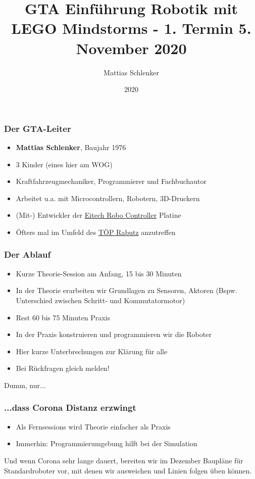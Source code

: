 \documentclass{beamer}
\title{GTA Einführung Robotik mit LEGO Mindstorms - 1. Termin 5. November 2020}
\author{Mattias Schlenker}
\institute{Wilhelm-Ostwald-Gymnasium}
\date{2020}
\begin{document}
\frame{\titlepage}

\begin{frame}
\frametitle{Der GTA-Leiter}
\begin{itemize}
\item \textbf{Mattias Schlenker}, Baujahr 1976
\item 3 Kinder (eines hier am WOG) 
\item Kraftfahrzeugmechaniker, Programmierer und Fachbuchautor 
\item Arbeitet u.a. mit Microcontrollern, Robotern, 3D-Druckern 
\item (Mit-) Entwickler der \href{https://www.youtube.com/watch?v=-ncd1DkRh1M}{Eitech Robo Controller} Platine  
\item Öfters mal im Umfeld des \href{http://www.projektzentrum-rabutz.de/}{TÖP Rabutz} anzutreffen
\end{itemize}
\end{frame}

\begin{frame}
\frametitle{Der Ablauf}
\begin{itemize}
\item Kurze Theorie-Session am Anfang, 15 bis 30 Minuten
\item In der Theorie erarbeiten wir Grundlagen zu Sensoren, Aktoren 
(Bspw. Unterschied zwischen Schritt- und Kommutatormotor)
\item Rest 60 bis 75 Minuten Praxis 
\item In der Praxis konstruieren und programmieren wir die Roboter
\item Hier kurze Unterbrechungen zur Klärung für alle 
\item Bei Rückfragen gleich melden!
\end{itemize}

Dumm, nur...

\end{frame}

\begin{frame}
\frametitle{...dass Corona Distanz erzwingt}
\begin{itemize}
\item Als Fernsessions wird Theorie einfacher als Praxis
\item Immerhin: Programmierumgebung hilft bei der Simulation
\end{itemize}

Und wenn Corona sehr lange dauert, bereiten wir im Dezember Baupläne für Standardroboter vor, 
mit denen wir ausweichen und Linien folgen üben können.

\end{frame}
\end{document}
